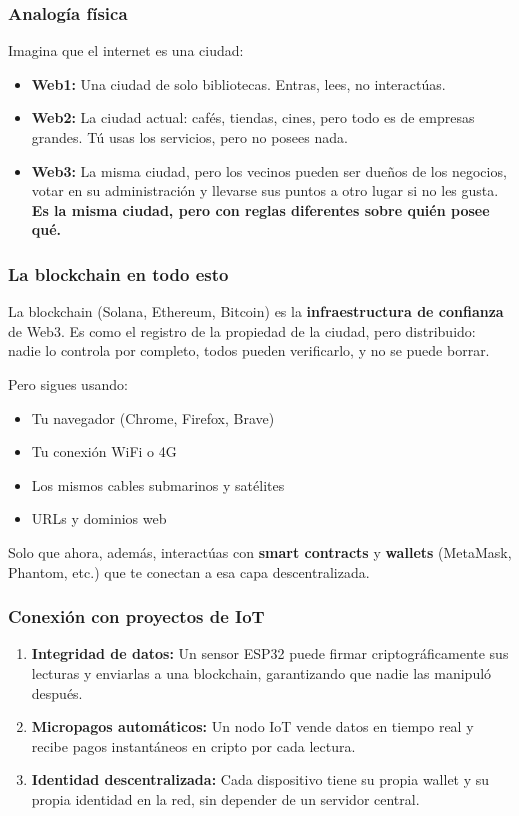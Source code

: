 \documentclass[12pt,a4paper]{article}
\begin{document}
\subsubsection{Analog\'{i}a f\'{i}sica}
Imagina que el internet es una ciudad:
\begin{itemize}
    \item \textbf{Web1:} Una ciudad de solo bibliotecas. Entras, lees, no interact\'{u}as.
    \item \textbf{Web2:} La ciudad actual: caf\'{e}s, tiendas, cines, pero todo es de empresas grandes. T\'{u} usas los servicios, pero no posees nada.
    \item \textbf{Web3:} La misma ciudad, pero los vecinos pueden ser due\~{n}os de los negocios, votar en su administraci\'{o}n y llevarse sus puntos a otro lugar si no les gusta. \textbf{Es la misma ciudad, pero con reglas diferentes sobre qui\'{e}n posee qu\'{e}.}
\end{itemize}

\subsubsection{La blockchain en todo esto}
La blockchain (Solana, Ethereum, Bitcoin) es la \textbf{infraestructura de confianza} de Web3. Es como el registro de la propiedad de la ciudad, pero distribuido: nadie lo controla por completo, todos pueden verificarlo, y no se puede borrar.

Pero sigues usando:
\begin{itemize}[noitemsep]
    \item Tu navegador (Chrome, Firefox, Brave)
    \item Tu conexión WiFi o 4G
    \item Los mismos cables submarinos y sat\'{e}lites
    \item URLs y dominios web
\end{itemize}

Solo que ahora, adem\'{a}s, interact\'{u}as con \textbf{smart contracts} y \textbf{wallets} (MetaMask, Phantom, etc.) que te conectan a esa capa descentralizada.

\subsubsection{Conexi\'{o}n con proyectos de IoT}
\begin{enumerate}
    \item \textbf{Integridad de datos:} Un sensor ESP32 puede firmar criptogr\'{a}ficamente sus lecturas y enviarlas a una blockchain, garantizando que nadie las manipul\'{o} despu\'{e}s.
    \item \textbf{Micropagos autom\'{a}ticos:} Un nodo IoT vende datos en tiempo real y recibe pagos instant\'{a}neos en cripto por cada lectura.
    \item \textbf{Identidad descentralizada:} Cada dispositivo tiene su propia wallet y su propia identidad en la red, sin depender de un servidor central.
\end{enumerate}
\end{document}

